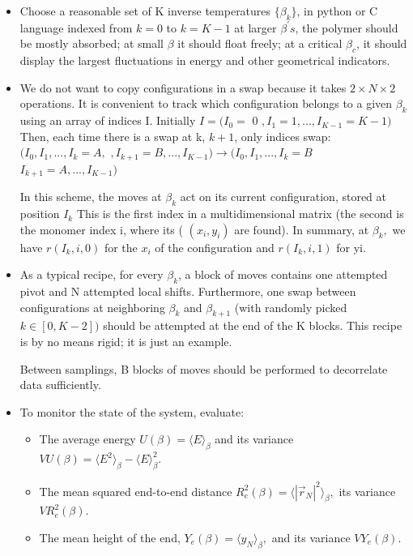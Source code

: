 \documentclass[../main.tex]{subfiles}
\begin{document}
\begin{itemize}
    \item Choose a reasonable set of K inverse temperatures $\{\beta_{k}\}$, in python or C language indexed from $k=0$ to $k=K-1$ at larger $\beta^{\prime}s$, the polymer should be mostly absorbed; at small $\beta$ it should float freely; at a critical $\beta_{c}$, it should display the largest fluctuations in energy and other geometrical indicators.

    \item We do not want to copy configurations in a swap because it takes $2\times N\times2$ operations. It is convenient to track which configuration belongs to a given $\beta_{k}$ using an array of indices I. Initially $I=(I_{0}=$ 0 $,I_{1}=1,...,I_{K-1}=K-1)$ Then, each time there is a swap at k, $k+1$, only indices swap:    
    $(I_{0},I_{1},...,I_{k}=A,$ $,I_{k+1}=B,...,I_{K-1})\rightarrow(I_{0},I_{1},...,I_{k}=B$ $I_{k+1}=A,...,I_{K-1})$ 

    In this scheme, the moves at $\beta_{k}$ act on its current configuration, stored at position $I_{k}$ This is the first index in a multidimensional matrix (the second is the monomer index i, where its ( $(x_{i},y_{i})$ are found).
    In summary, at $\beta_{k},$ we have $r(I_{k},i,0)$ for the $x_{i}$ of the configuration and $r(I_{k},i,1)$ for yi.

    \item As a typical recipe, for every $\beta_{k}$, a block of moves contains one attempted pivot and N attempted local shifts. Furthermore, one swap between configurations at neighboring $\beta_{k}$ and $\beta_{k+1}$ (with randomly picked $k\in[0,K-2])$ should be attempted at the end of the K blocks. This recipe is by no means rigid;  it is just an example.

    Between samplings, B blocks of moves should be performed to decorrelate data sufficiently.

    \item To monitor the state of the system, evaluate:
    \begin{itemize}
        \item The average energy $U(\beta)=\langle E\rangle_{\beta}$ and its variance $VU(\beta)=\langle E^{2}\rangle_{\beta}-\langle E\rangle_{\beta}^{2}.$ 
        \item The mean squared end-to-end distance $R_{e}^{2}(\beta)=\langle|\vec{r}_{N}|^{2}\rangle_{\beta},$ its variance $VR_{e}^{2}(\beta)$.
        \item     The mean height of the end, $Y_{e}(\beta)=\langle y_{N}\rangle_{\beta},$ and its variance $VY_{e}(\beta)$.
    \end{itemize}

\end{itemize}
\end{document}

